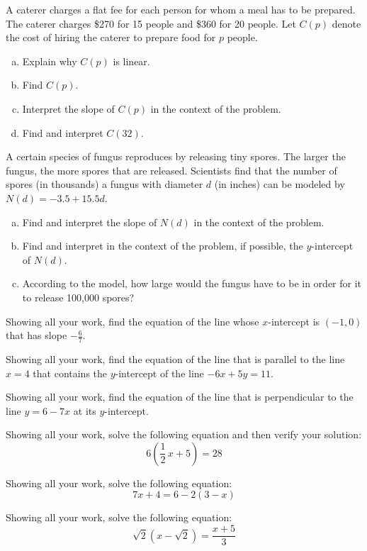 \documentclass[11pt,letterpaper]{article}
\begin{document}
\prob A caterer charges a flat fee for each person for whom a meal has to be prepared. The caterer charges \$270 for 15 people and \$360 for 20 people. Let $C(p)$ denote the cost of hiring the caterer to prepare food for $p$ people. 
	\begin{enumerate}[(a)]
	\item Explain why $C(p)$ is linear.
	\item Find $C(p)$.
	\item Interpret the slope of $C(p)$ in the context of the problem. 
	\item Find and interpret $C(32)$. 
	\end{enumerate} \pspace


\prob A certain species of fungus reproduces by releasing tiny spores. The larger the fungus, the more spores that are released. Scientists find that the number of spores (in thousands) a fungus with diameter $d$ (in inches) can be modeled by $N(d)= -3.5 + 15.5d$.
	\begin{enumerate}[(a)]
	\item Find and interpret the slope of $N(d)$ in the context of the problem.
	\item Find and interpret in the context of the problem, if possible, the $y$-intercept of $N(d)$.
	\item According to the model, how large would the fungus have to be in order for it to release 100,000 spores?
	\end{enumerate} \pspace


\prob Showing all your work, find the equation of the line whose $x$-intercept is $(-1, 0)$ that has slope $-\frac{6}{7}$. \pspace


\prob Showing all your work, find the equation of the line that is parallel to the line $x= 4$ that contains the $y$-intercept of the line $-6x + 5y= 11$. \pspace


\prob Showing all your work, find the equation of the line that is perpendicular to the line $y= 6 - 7x$ at its $y$-intercept. \pspace


\prob Showing all your work, solve the following equation and then verify your solution:
	\[
	6 \left( \dfrac{1}{2}\,x + 5 \right)= 28
	\] \pspace


\prob Showing all your work, solve the following equation:
	\[
	7x + 4= 6 - 2(3 - x)
	\] \pspace


\prob Showing all your work, solve the following equation:
	\[
	\sqrt{2} \left( x - \sqrt{2} \right)= \dfrac{x + 5}{3}
	\] \pspace
\end{document}
